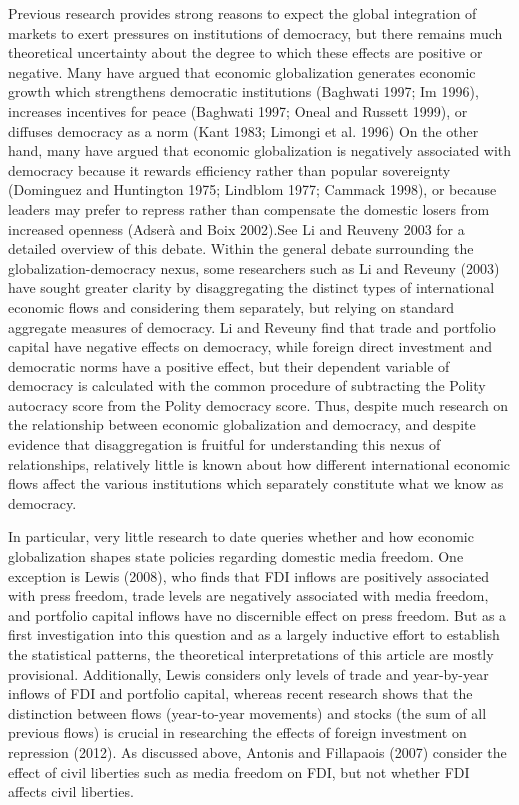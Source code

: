 \documentclass[a4paper]{article}\usepackage[]{graphicx}\usepackage[]{color}
\begin{document}
Previous research provides strong reasons to expect the global integration of markets to exert pressures on institutions of democracy, but there remains much theoretical uncertainty about the degree to which these effects are positive or negative. Many have argued that economic globalization generates economic growth which strengthens democratic institutions (Baghwati 1997; Im 1996), increases incentives for peace (Baghwati 1997; Oneal and Russett 1999), or diffuses democracy as a norm (Kant 1983; Limongi et al. 1996) On the other hand, many have argued that economic globalization is negatively associated with democracy because it rewards efficiency rather than popular sovereignty (Dominguez and Huntington 1975; Lindblom 1977; Cammack 1998), or because leaders may prefer to repress rather than compensate the domestic losers from increased openness (Adserà and Boix 2002).See Li and Reuveny 2003 for a detailed overview of this debate. Within the general debate surrounding the globalization-democracy nexus, some researchers such as Li and Reveuny (2003) have sought greater clarity by disaggregating the distinct types of international economic flows and considering them separately, but relying on standard aggregate measures of democracy. Li and Reveuny find that trade and portfolio capital have negative effects on democracy, while foreign direct investment and democratic norms have a positive effect, but their dependent variable of democracy is calculated with the common procedure of subtracting the Polity autocracy score from the Polity democracy score. Thus, despite much research on the relationship between economic globalization and democracy, and despite evidence that disaggregation is fruitful for understanding this nexus of relationships, relatively little is known about how different international economic flows affect the various institutions which separately constitute what we know as democracy.

In particular, very little research to date queries whether and how economic globalization shapes state policies regarding domestic media freedom. One exception is Lewis (2008), who finds that FDI inflows are positively associated with press freedom, trade levels are negatively associated with media freedom, and portfolio capital inflows have no discernible effect on press freedom. But as a first investigation into this question and as a largely inductive effort to establish the statistical patterns, the theoretical interpretations of this article are mostly provisional. Additionally, Lewis considers only levels of trade and year-by-year inflows of FDI and portfolio capital, whereas recent research shows that the distinction between flows (year-to-year movements) and stocks (the sum of all previous flows) is crucial in researching the effects of foreign investment on repression (2012). As discussed above, Antonis and Fillapaois (2007) consider the effect of civil liberties such as media freedom on FDI, but not whether FDI affects civil liberties.
\end{document}
